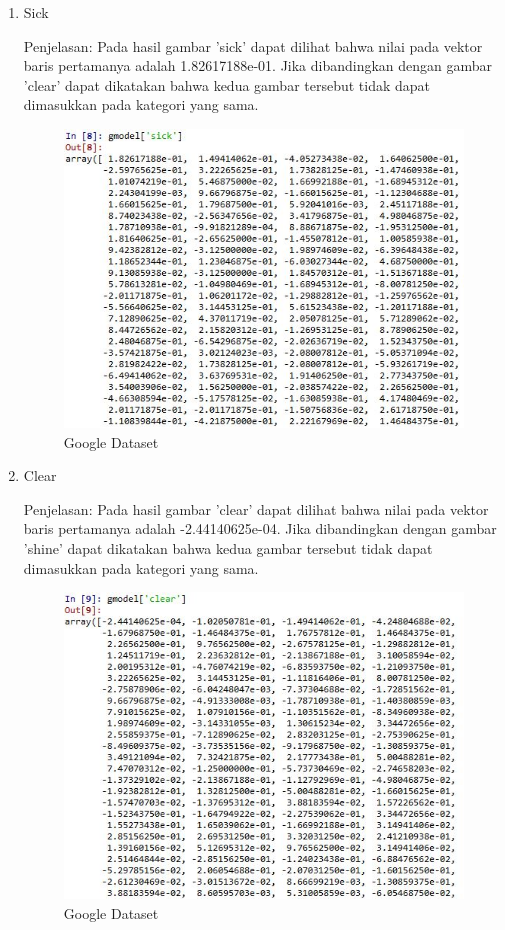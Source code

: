 \begin{enumerate}
\begin{enumerate}
\item Sick

Penjelasan: Pada hasil gambar 'sick' dapat dilihat bahwa nilai pada vektor baris pertamanya adalah 1.82617188e-01. Jika dibandingkan dengan gambar 'clear' dapat dikatakan bahwa kedua gambar tersebut tidak dapat dimasukkan pada kategori yang sama.

\begin{figure}[!hbtp]
\centering
\includegraphics[scale=0.7]{figures/1174031/5/15sick.jpg}
\caption{Google Dataset}
\label{Google Dataset}
\end{figure}

\item Clear

Penjelasan: Pada hasil gambar 'clear' dapat dilihat bahwa nilai pada vektor baris pertamanya adalah -2.44140625e-04. Jika dibandingkan dengan gambar 'shine' dapat dikatakan bahwa kedua gambar tersebut tidak dapat dimasukkan pada kategori yang sama.

\begin{figure}[!hbtp]
\centering
\includegraphics[scale=0.7]{figures/1174031/5/16clear.jpg}
\caption{Google Dataset}
\label{Google Dataset}
\end{figure}


\end{enumerate}
\end{enumerate}

